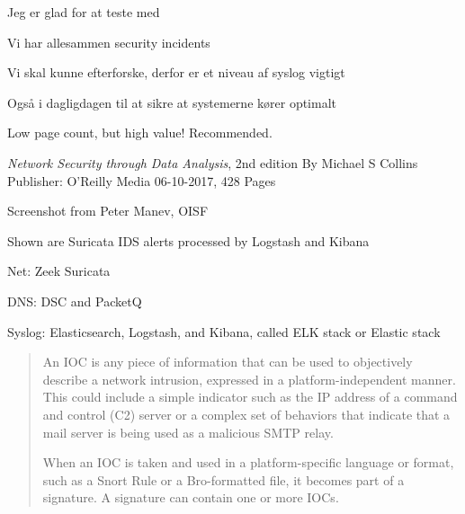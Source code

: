 \documentclass[Screen16to9,17pt]{foils}
\begin{document}
\centerline{Jeg er glad for at teste med }



\begin{list2}
\item Vi har allesammen security incidents
\item Vi skal kunne efterforske, derfor er et niveau af syslog vigtigt
\item Også i dagligdagen til at sikre at systemerne kører optimalt
\end{list2}




\begin{list2}
\item Low page count, but high value! Recommended.
\item \emph{Network Security through Data Analysis}, 2nd edition
By Michael S Collins Publisher: O'Reilly Media
06-10-2017, 428 Pages
\end{list2}




\begin{list2}
\item Screenshot from Peter Manev, OISF
\item Shown are Suricata IDS alerts processed by Logstash and Kibana
\end{list2}




\begin{list2}
\item Net: Zeek  Suricata 
\item DNS: DSC and PacketQ 
\item Syslog: Elasticsearch, Logstash, and Kibana, called ELK stack or Elastic stack
\end{list2}


\begin{quote}
An IOC is any piece of information that can be used to objectively describe a
network intrusion, expressed in a platform-independent manner. This could include a simple indicator such as the IP address of a command and control (C2) server or a complex set of behaviors that indicate that a mail server is being used as a malicious SMTP relay.

When an IOC is taken and used in a platform-specific language or format, such as a Snort Rule or a Bro-formatted file, it becomes part of a signature. A signature can contain one or more IOCs.
\end{quote}
\end{document}
